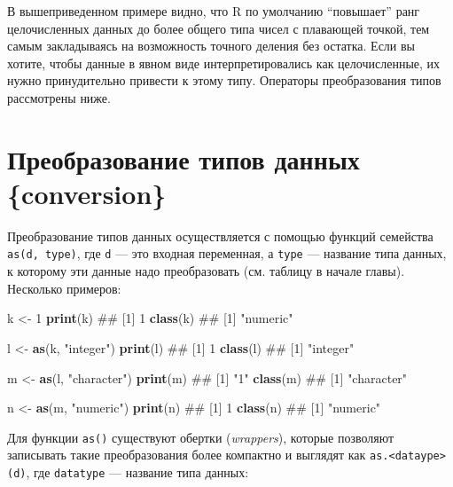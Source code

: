 \documentclass[]{book}
\newenvironment{Shaded}{\begin{snugshade}}{\end{snugshade}}
\newcommand{\KeywordTok}[1]{\textcolor[rgb]{0.13,0.29,0.53}{\textbf{#1}}}
\newcommand{\DecValTok}[1]{\textcolor[rgb]{0.00,0.00,0.81}{#1}}
\newcommand{\StringTok}[1]{\textcolor[rgb]{0.31,0.60,0.02}{#1}}
\newcommand{\NormalTok}[1]{#1}
\begin{document}
В вышеприведенном примере видно, что R по умолчанию ``повышает'' ранг
целочисленных данных до более общего типа чисел с плавающей точкой, тем
самым закладываясь на возможность точного деления без остатка. Если вы
хотите, чтобы данные в явном виде интерпретировались как целочисленные,
их нужно принудительно привести к этому типу. Операторы преобразования
типов рассмотрены ниже.

\section{Преобразование типов данных
\{conversion\}}\label{---conversion}

Преобразование типов данных осуществляется с помощью функций семейства
\texttt{as(d,\ type)}, где \texttt{d} --- это входная переменная, а
\texttt{type} --- название типа данных, к которому эти данные надо
преобразовать (см. таблицу в начале главы). Несколько примеров:

\begin{Shaded}
\begin{Highlighting}[]
\NormalTok{k <-}\StringTok{ }\DecValTok{1}
\KeywordTok{print}\NormalTok{(k)}
\NormalTok{## [1] 1}
\KeywordTok{class}\NormalTok{(k)}
\NormalTok{## [1] "numeric"}

\NormalTok{l <-}\StringTok{ }\KeywordTok{as}\NormalTok{(k, }\StringTok{"integer"}\NormalTok{)}
\KeywordTok{print}\NormalTok{(l)}
\NormalTok{## [1] 1}
\KeywordTok{class}\NormalTok{(l)}
\NormalTok{## [1] "integer"}

\NormalTok{m <-}\StringTok{ }\KeywordTok{as}\NormalTok{(l, }\StringTok{"character"}\NormalTok{)}
\KeywordTok{print}\NormalTok{(m)}
\NormalTok{## [1] "1"}
\KeywordTok{class}\NormalTok{(m)}
\NormalTok{## [1] "character"}

\NormalTok{n <-}\StringTok{ }\KeywordTok{as}\NormalTok{(m, }\StringTok{"numeric"}\NormalTok{)}
\KeywordTok{print}\NormalTok{(n)}
\NormalTok{## [1] 1}
\KeywordTok{class}\NormalTok{(n)}
\NormalTok{## [1] "numeric"}
\end{Highlighting}
\end{Shaded}

Для функции \texttt{as()} существуют обертки (\emph{wrappers}), которые
позволяют записывать такие преобразования более компактно и выглядят как
\texttt{as.\textless{}dataype\textgreater{}(d)}, где \texttt{datatype}
--- название типа данных:
\end{document}
